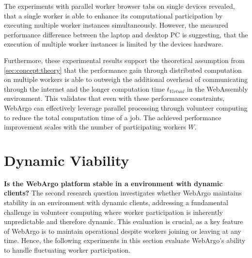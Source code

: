 The experiments with parallel worker browser tabs on single devices revealed, that a single worker is able to enhance its computational participation by executing multiple worker instances simultaneously. However, the measured performance difference between the laptop and desktop \ac{PC} is suggesting, that the execution of multiple worker instances is limited by the devices hardware.

Furthermore, these experimental results support the theoretical assumption from \autoref{sec:concept:theory} that the performance gain through distributed computation on multiple workers is able to outweigh the additional overhead of communicating through the internet and the longer computation time $t_{Virtual}$ in the WebAssembly environment. This validates that even with these performance constraints, WebArgo can effectively leverage parallel processing through volunteer computing to reduce the total computation time of a job. The achieved performance improvement scales with the number of participating workers $W$.

\section{Dynamic Viability}
\label{sec:evaluation:dynamic}
\textbf{Is the WebArgo platform stable in a environment with dynamic clients?}
\newline
The second research question investigates whether WebArgo maintains stability in an environment with dynamic clients, addressing a fundamental challenge in volunteer computing where worker participation is inherently unpredictable and therefore dynamic. This evaluation is crucial, as a key feature of WebArgo is to maintain operational despite workers joining or leaving at any time. Hence, the following experiments in this section evaluate WebArgo's ability to handle fluctuating worker participation.

